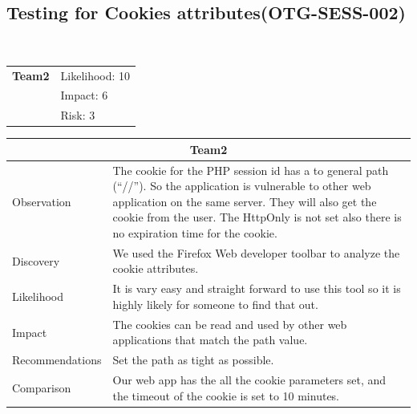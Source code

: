 \documentclass[headsepline,footsepline,footinclude=false,oneside,fontsize=11pt,paper=a4,listof=totoc,bibliography=totoc]{scrbook} %
\begin{document}
\pagebreak
\subsection{Testing for Cookies attributes(OTG-SESS-002)}\

\begin{tabular}{cR{12cm}}
	\textbf{Team2} & Likelihood: 10\\& Impact: 6\\& Risk: 3
\end{tabular}


\begin{tabular}{ l|p{11cm}  }
	\hline
	\multicolumn{2}{c}{\textbf{Team2}} \\
	\hline
	Observation &  The cookie for the PHP session id has a to general path (``//''). So
	the application is vulnerable to other web application on the same server. They will
	also get the cookie from the user.  The HttpOnly is not set also there is no expiration time for the cookie.\\
	Discovery  & We used the Firefox Web developer toolbar to analyze the cookie attributes. \\
	Likelihood & It is vary easy and straight forward to use this tool so it is highly likely for someone to find that out.\\
	Impact    & The cookies can be read and used by other web applications that
	match the path value. \\
	Recommendations & Set the path as tight as possible. \\
	Comparison & Our web app has the all the cookie parameters set, and the timeout of the cookie is set to 10 minutes.\\
	\hline
\end{tabular}
\\
\vspace{0.5cm}
\\
\end{document}
